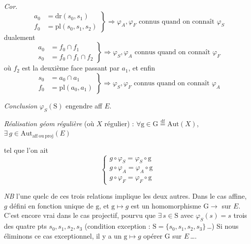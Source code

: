 \documentclass[11pt,a4paper]{article}
\begin{document}
\emph{Cor.}
\[
\left.\begin{aligned}
a_0&=\mathrm{dr}(s_0,s_1)\\
f_0&=\mathrm{pl}(s_0,s_1,s_2)
\end{aligned}\right\}\Longrightarrow \varphi_A,\varphi_F \text{ connus quand on connaît } \varphi_S
\]
dualement
\[
\left.\begin{aligned}
a_0&=f_0\cap f_1\\
s_0&=f_0\cap f_1\cap f_2
\end{aligned}\right\}\Longrightarrow \varphi_S,\varphi_A \text{ connus quand on connaît } \varphi_F
\]
où $f_2$ est la deuxième face passant par $a_1$, et enfin
\[
\left.\begin{aligned}
s_0&=a_0\cap a_1\\
f_0&=\mathrm{pl}(a_0,a_1)
\end{aligned}\right\}\Longrightarrow \varphi_S,\varphi_F \text{ connus quand on connaît } \varphi_A
\]

\emph{Conclusion} $\varphi_S(\mathrm{S})$ engendre aff $E$.

\emph{Réalisation géom} \emph{régulière} (où $X$ régulier) :
$\forall \mathrm{g}\in \mathrm{G}\overset{\mathrm{df}}{=}\mathrm{Aut}(X)$, $\exists\, g\in\mathrm{Aut}_{\mathrm{aff\ ou\ proj}}(E)$

tel que \struck{\ill{}} l'on ait
\[
\begin{cases}
g\circ\varphi_S = \varphi_S\circ\mathrm{g}\\
g\circ\varphi_A = \varphi_A\circ\mathrm{g}\\
g\circ\varphi_F = \varphi_F\circ\mathrm{g}
\end{cases}
\]

\emph{NB} l'une quelc de ces trois relations implique les deux autres. Dans le cas affine, $g$ défini en fonction unique de $\mathrm{g}$, et $\mathrm{g}\mapsto g$ est un homomorphisme $\mathrm{G}\to$  sur $E$. C'est encore vrai dans le cas projectif, pourvu que
$\exists\, s\in\mathrm{S}$ avec $\varphi_S(s)=s$  trois des quatre pts $s_0,s_1,s_2,s_3$ (condition
exception :  \struck{\ill{}} $\mathrm{S}=\{s_0,s_1,s_2,s_3\}$\,\ldots) Si \ill{} nous éliminons ce cas exceptionnel, il y a un \emph{} $\mathrm{g}\mapsto g$  opérer $\mathrm{G}$ sur $E$\,\ldots.
\end{document}
